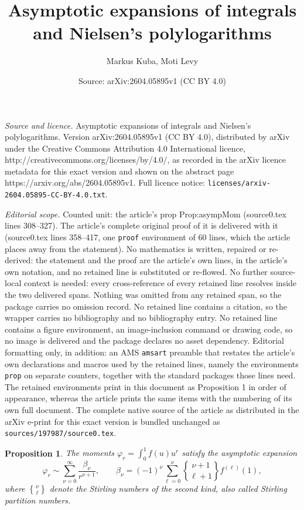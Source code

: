 \documentclass[10pt,a4paper]{amsart}
\title{Asymptotic expansions of integrals and Nielsen's polylogarithms}
\author{Markus Kuba, Moti Levy}
\date{Source: arXiv:2604.05895v1 (CC BY 4.0)}
\newtheorem{prop}{Proposition}
\begin{document}
\maketitle

\noindent\emph{Source and licence.} Asymptotic expansions of integrals and Nielsen's polylogarithms. Version arXiv:2604.05895v1 (CC BY 4.0), distributed by arXiv under the Creative Commons Attribution 4.0 International licence, http://creativecommons.org/licenses/by/4.0/, as recorded in the arXiv licence metadata for this exact version and shown on the abstract page https://arxiv.org/abs/2604.05895v1. Full licence notice: \texttt{licenses/arxiv-2604.05895-CC-BY-4.0.txt}.\par\smallskip

\noindent\textit{Editorial scope.} Counted unit: the article's prop Prop:asympMom (source0.tex lines 308--327). The article's complete original proof of it is delivered with it (source0.tex lines 358--417, one \texttt{proof} environment of 60 lines, which the article places away from the statement). No mathematics is written, repaired or re-derived: the statement and the proof are the article's own lines, in the article's own notation, and no retained line is substituted or re-flowed.  No further source-local context is needed: every cross-reference of every retained line resolves inside the two delivered spans.  Nothing was omitted from any retained span, so the package carries no omission record.  No retained line contains a citation, so the wrapper carries no bibliography and no bibliography entry.  No retained line contains a figure environment, an image-inclusion command or drawing code, so no image is delivered and the package declares no asset dependency.  Editorial formatting only, in addition: an AMS \texttt{amsart} preamble that restates the article's own declarations and macros used by the retained lines, namely the environments \texttt{prop} on separate counters, together with the standard packages those lines need.  The retained environments print in this document as Proposition 1 in order of appearance, whereas the article prints the same items with the numbering of its own full document.  The complete native source of the article as distributed in the arXiv e-print for this exact version is bundled unchanged as \texttt{sources/197987/source0.tex}.
\begin{prop}
\label{Prop:asympMom} The moments $\varphi_{r}=\int_{0}^{1}f(u)u^{r}$ satisfy
the asymptotic expansion
\[
\varphi_{r}\sim\sum_{\nu=0}^{\infty}\frac{\beta_{\nu}}{r^{\nu+1}},\qquad
\beta_{\nu}=(-1)^{\nu}\sum_{\ell=0}^{\nu}%
\genfrac{\{}{\}}{0pt}{}{\nu+1}{\ell+1}%
f^{(\ell)}(1),
\]
where $%
\genfrac{\{}{\}}{0pt}{}{\nu}{\ell}%
$ denote the Stirling numbers of the second kind, also called Stirling
partition numbers.
\end{prop}
\end{document}
